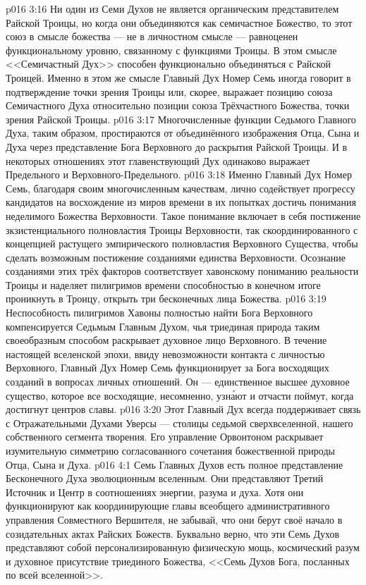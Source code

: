 \vs p016 3:16 Ни один из Семи Духов не является органическим представителем Райской Троицы, но когда они объединяются как семичастное Божество, то этот союз в смысле божества --- не в личностном смысле --- равноценен функциональному уровню, связанному с функциями Троицы. В этом смысле <<Семичастный Дух>> способен функционально объединяться с Райской Троицей. Именно в этом же смысле Главный Дух Номер Семь иногда говорит в подтверждение точки зрения Троицы или, скорее, выражает позицию союза Семичастного Духа относительно позиции союза Трёхчастного Божества, точки зрения Райской Троицы.
\vs p016 3:17 Многочисленные функции Седьмого Главного Духа, таким образом, простираются от объединённого изображения  Отца, Сына и Духа через представление  Бога Верховного до раскрытия  Райской Троицы. И в некоторых отношениях этот главенствующий Дух одинаково выражает  Предельного и Верховного\hyp{}Предельного.
\vs p016 3:18 Именно Главный Дух Номер Семь, благодаря своим многочисленным качествам, лично содействует прогрессу кандидатов на восхождение из миров времени в их попытках достичь понимания неделимого Божества Верховности. Такое понимание включает в себя постижение зкзистенциального полновластия Троицы Верховности, так скоординированного с концепцией растущего эмпирического полновластия Верховного Существа, чтобы сделать возможным постижение созданиями единства Верховности. Осознание созданиями этих трёх факторов соответствует хавонскому пониманию реальности Троицы и наделяет пилигримов времени способностью в конечном итоге проникнуть в Троицу, открыть три бесконечных лица Божества.
\vs p016 3:19 Неспособность пилигримов Хавоны полностью найти Бога Верховного компенсируется Седьмым Главным Духом, чья триединая природа таким своеобразным способом раскрывает духовное лицо Верховного. В течение настоящей вселенской эпохи, ввиду невозможности контакта с личностью Верховного, Главный Дух Номер Семь функционирует за Бога восходящих созданий в вопросах личных отношений. Он --- единственное высшее духовное существо, которое все восходящие, несомненно, узн\'ают и отчасти поймут, когда достигнут центров славы.
\vs p016 3:20 Этот Главный Дух всегда поддерживает связь с Отражательными Духами Уверсы --- столицы седьмой сверхвселенной, нашего собственного сегмента творения. Его управление Орвонтоном раскрывает изумительную симметрию согласованного сочетания божественной природы Отца, Сына и Духа.
\vs p016 4:1 Семь Главных Духов есть полное представление Бесконечного Духа эволюционным вселенным. Они представляют Третий Источник и Центр в соотношениях энергии, разума и духа. Хотя они функционируют как координирующие главы всеобщего административного управления Совместного Вершителя, не забывай, что они берут своё начало в созидательных актах Райских Божеств. Буквально верно, что эти Семь Духов представляют собой персонализированную физическую мощь, космический разум и духовное присутствие триединого Божества, <<Семь Духов Бога, посланных по всей вселенной>>.
